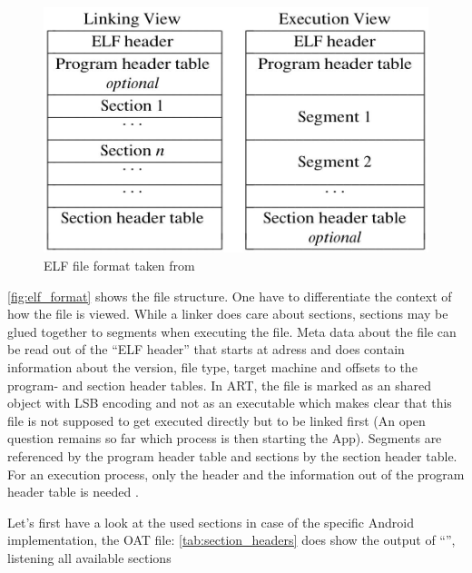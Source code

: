 \begin{figure}[htb]
  \centering
  \includegraphics[scale=0.4]{figures/elf_format}
  \caption[ELF file format]{ELF file format taken from \parencite{portable_formats_spec}}
  \label{fig:elf_format}
\end{figure}

\autoref{fig:elf_format} shows the file structure.
One have to differentiate the context of how the file is viewed.
While a linker does care about sections, sections may be
glued together to segments when executing the file.
Meta data about the file can be read out of the ``ELF header''
that starts at adress  and does contain
information about the version, file type, target machine and
offsets to the program- and section header tables.
In ART, the file is marked as an shared object with LSB encoding
and not as an executable which makes clear that this file is not
supposed to get executed directly but to be linked first
(An open question remains so far which process is then starting
the App).
Segments are referenced by the program header table and sections
by the section header table. For an execution process, only the header
and the information out of the program header table is needed
\parencite{life_of_binaries}.

Let's first have a look at the used sections in case of the specific
Android implementation, the OAT file:
\autoref{tab:section_headers} does show the output of
``'', listening all available sections


